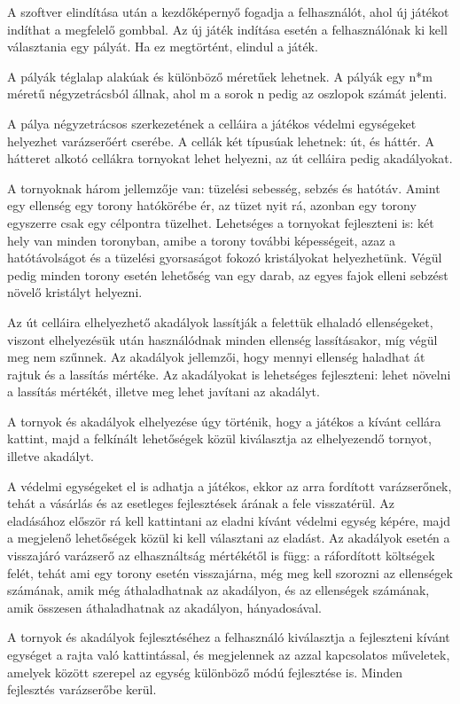 A szoftver elindítása után a kezdőképernyő fogadja a felhasználót, ahol új játékot indíthat a megfelelő gombbal. Az új játék indítása esetén a felhasználónak ki kell választania egy pályát. Ha ez megtörtént, elindul a játék. 

A pályák téglalap alakúak és különböző méretűek lehetnek. A pályák egy n*m méretű négyzetrácsból állnak, ahol m a sorok n pedig az oszlopok számát jelenti. 

A pálya négyzetrácsos szerkezetének a celláira a játékos védelmi egységeket helyezhet varázserőért cserébe. A cellák két típusúak lehetnek: út, és háttér. A hátteret alkotó cellákra tornyokat lehet helyezni, az út celláira pedig akadályokat. 

A tornyoknak 	három jellemzője van: tüzelési sebesség, sebzés és hatótáv. Amint egy ellenség egy torony hatókörébe ér, az tüzet nyit rá, azonban egy torony egyszerre csak egy célpontra tüzelhet. Lehetséges a tornyokat fejleszteni is: két hely van minden toronyban, amibe a torony további képességeit, azaz a hatótávolságot és a tüzelési gyorsaságot fokozó kristályokat helyezhetünk. Végül pedig minden torony esetén lehetőség van egy darab, az egyes fajok elleni sebzést növelő kristályt helyezni.

Az út celláira elhelyezhető akadályok lassítják a felettük elhaladó ellenségeket, viszont elhelyezésük után használódnak minden ellenség lassításakor, míg végül meg nem szűnnek. Az akadályok jellemzői, hogy mennyi ellenség haladhat át rajtuk és a lassítás mértéke. Az akadályokat is lehetséges fejleszteni: lehet növelni a lassítás mértékét, illetve meg lehet javítani az akadályt. 

A tornyok és akadályok elhelyezése úgy történik, hogy a játékos a kívánt cellára kattint, majd a felkínált lehetőségek közül kiválasztja az elhelyezendő tornyot, illetve akadályt. 

A védelmi egységeket el is adhatja a játékos, ekkor az arra fordított varázserőnek, tehát a vásárlás és az esetleges fejlesztések árának a fele visszatérül. Az eladásához először rá kell kattintani az eladni kívánt védelmi egység képére, majd a megjelenő lehetőségek közül ki kell választani az eladást. Az akadályok esetén a visszajáró varázserő az elhasználtság mértékétől is függ: a ráfordított költségek felét, tehát ami egy torony esetén visszajárna, még meg kell szorozni az ellenségek számának, amik még áthaladhatnak az akadályon, és az ellenségek számának, amik összesen áthaladhatnak az akadályon, hányadosával.
 
A tornyok és akadályok fejlesztéséhez a felhasználó kiválasztja a fejleszteni kívánt egységet a rajta való kattintással, és megjelennek az azzal kapcsolatos műveletek, amelyek között szerepel az egység különböző módú fejlesztése is. Minden fejlesztés varázserőbe kerül. 

